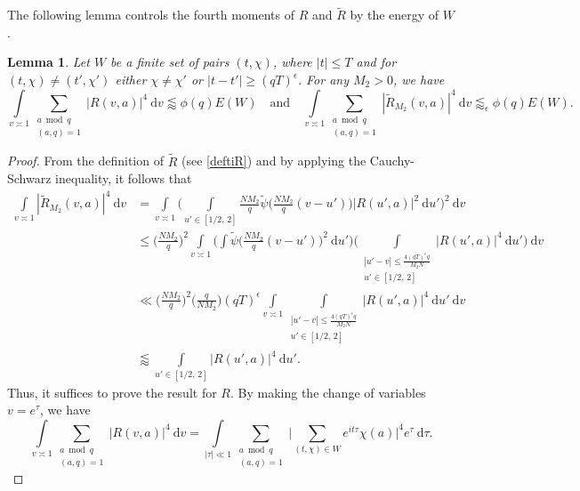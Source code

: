 \documentclass[12pt]{amsart}
\newtheorem{lemma}[theorem]{Lemma}
\theoremstyle{definition}
\theoremstyle{plain}
\theoremstyle{remark}
\numberwithin{equation}{section}
\numberwithin{theorem}{section}
\numberwithin{equation}{section}
\begin{document}
	The following lemma controls the fourth moments of $R$ and $\tilde{R}$ by the energy of $W$.
	\begin{lemma}\label{fourthm}
		Let $W$ be a finite set of pairs $(t, \chi)$,  where $|t| \leq T$ and for $(t, \chi)\neq (t', \chi')$ either $\chi \neq \chi'$ or $|t-t'|\geq (qT)^{\epsilon}$. For any $M_{2}>0$, we have
		\[\int\limits_{v \asymp 1}\sum_{\substack{a \bmod q \\ (a,q)=1}}|R(v, a)|^{4}\:\mathrm{d}v \lessapprox \phi(q)E(W) \quad \mbox{and} \quad \int\limits_{v \asymp 1}\sum_{\substack{a \bmod q \\ (a,q)=1}}|\tilde{R}_{M_{2}}(v, a)|^{4}\:\mathrm{d}v \lessapprox_{\epsilon} \phi(q)E(W).
		\]
	\end{lemma}
	\begin{proof}
		From the definition of $\tilde{R}$ (see \eqref{deftiR}) and by applying the Cauchy-Schwarz inequality, it follows that
		\begin{align*}
			\int\limits_{v \asymp 1}|\tilde{R}_{M_{2}}(v, a)|^{4}\:\mathrm{d}v
			&= \int\limits_{v \asymp 1}\bigg(\int\limits_{ u' \in [1/2,\, 2]}\frac{NM_{2}}{q}\tilde{\psi}\bigg(\frac{NM_{2}}{q}(v-u')\bigg)| R(u', a)|^{2}
			\:\mathrm{d}u' \bigg)^{2}\:\mathrm{d}v
			\\
			&\leq \bigg(\frac{NM_{2}}{q}\bigg)^{2}\int\limits_{v \asymp 1}\bigg(\int\tilde{\psi}\bigg(\frac{NM_{2}}{q}(v-u')\bigg)^{2}
			\:\mathrm{d}u'\bigg)
			\bigg(\int\limits_{ \substack{|u'-v| \leq \frac{4(qT)^{\epsilon}q}{M_{2}N} \\ u' \in [1/2, \, 2]}}| R(u', a)|^{4}
			\:\mathrm{d}u' \bigg)\:\mathrm{d}v
			\\
			&\ll \bigg(\frac{NM_{2}}{q}\bigg)^{2}\bigg(\frac{q}{NM_{2}}\bigg)(qT)^{\epsilon}\int\limits_{v \asymp 1}
			\int\limits_{ \substack{|u'-v| \leq \frac{4(qT)^{\epsilon}q}{M_{2}N} \\ u' \in [1/2, \, 2]}}|R(u', a)|^{4}
			\:\mathrm{d}u'\:\mathrm{d}v \\
			&\lessapprox
			\int\limits_{u' \in [1/2, \, 2]}|R(u', a)|^{4}
			\:\mathrm{d}u'.
		\end{align*}
		Thus, it suffices to prove the result for $R$. By making the change of variables $v=e^{\tau}$, we have
		\[\int\limits_{v \asymp 1}\sum_{\substack{a \bmod q \\ (a,q)=1}}|R(v, a)|^{4}\:\mathrm{d}v =
		\int\limits_{|\tau|\ll 1}\sum_{\substack{a \bmod q \\ (a,q)=1}}\bigg|\sum_{(t, \chi) \in W}e^{it\tau}\chi(a)\bigg|^{4}e^{\tau}\:\mathrm{d}\tau.\]

\end{proof}
\end{document}
